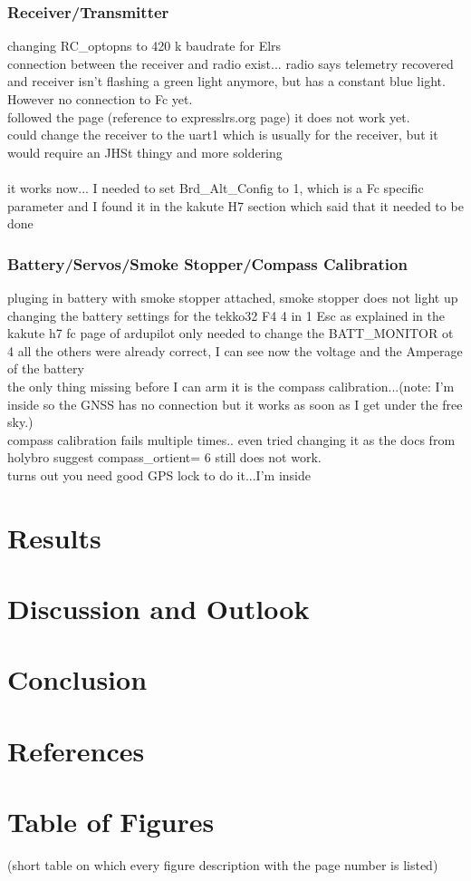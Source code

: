 \documentclass{article}
\begin{document}
	\subsubsection{Receiver/Transmitter}
	changing RC\_optopns to 420 k baudrate for Elrs
	\\ connection between the receiver and radio exist... radio says telemetry recovered and receiver isn't flashing a green light anymore, but has a constant blue light. However no connection to Fc yet.
	\\ followed the page (reference to expresslrs.org page) it does not work yet. 
	\\ could change the receiver to the uart1 which is usually for the receiver, but it would require an JHSt thingy and more soldering
	\\
	\\ it works now... I needed to set Brd\_Alt\_Config to 1, which is a Fc specific parameter and I found it in the kakute H7 section which said that it needed to be done
	\subsubsection*{Battery/Servos/Smoke Stopper/Compass Calibration}
	pluging in battery with smoke stopper attached, smoke stopper does not light up
	\\changing the battery settings for the tekko32 F4 4 in 1 Esc as explained in the kakute h7 fc page of ardupilot only needed to change the BATT\_MONITOR ot 4 all the others were already correct, I can see now the voltage and the Amperage of the battery
	\\the only thing missing before I can arm it is the compass calibration...(note: I'm inside so the GNSS has no connection but it works as soon as I get under the free sky.)
	\\ compass calibration fails multiple times.. even tried changing it as the docs from holybro suggest compass\_ortient= 6 still does not work. 
	\\ turns out you need good GPS lock to do it...I'm inside
	\section{Results}
	\section{Discussion and Outlook}
	\section{Conclusion}
	
	\section{References}
	\printbibliography[
	heading=bibintoc,
	title={Bibliography}
	]	
	\section{Table of Figures}
	(short table on which every figure description with the page number is listed)
\end{document}
